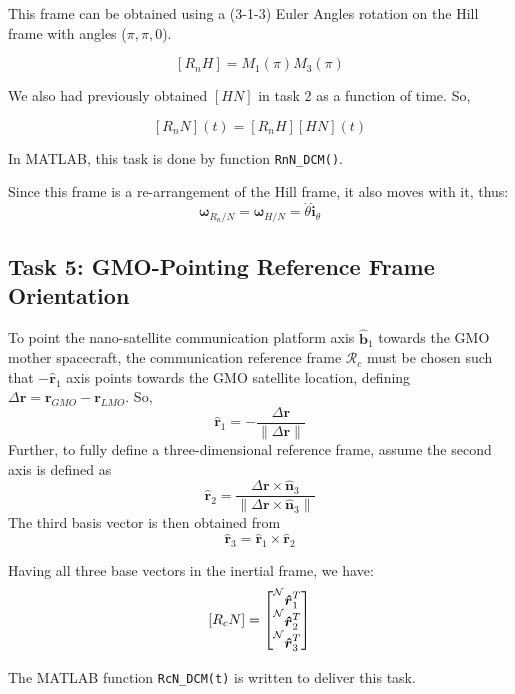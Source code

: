 \documentclass[12pt,a4paper]{report}
\begin{document}
	This frame can be obtained using a (3-1-3) Euler Angles rotation on the Hill frame with angles ($\pi, \pi, 0$).
	
	$$[R_nH] = M_1(\pi)M_3(\pi)$$
	
	
	 We also had previously obtained $[HN]$ in task 2 as a function of time. So,
	 
	 $$[R_nN] (t) = [R_nH][HN](t) $$
	 
	 In MATLAB, this task is done by function \texttt{RnN\_DCM()}.
	
	Since this frame is a re-arrangement of the Hill frame, it also moves with it, thus:
	$$\boldsymbol{\omega}_{R_n/N} = \boldsymbol{\omega}_{H/N} = \dot{\theta}\boldsymbol{\hat{i}}_\theta$$
	 
	
	
	
	\subsection{Task 5: GMO-Pointing Reference Frame Orientation}
	
	To point the nano-satellite communication platform axis $\boldsymbol{\hat{b}}_1$ towards the GMO mother spacecraft, the communication reference frame $\mathcal{R}_c$ must be chosen such that $-\boldsymbol{\hat{r}}_1$ axis points towards the GMO satellite location, defining $\Delta\boldsymbol{r} = \boldsymbol{r}_{GMO} - \boldsymbol{r}_{LMO}$. So,
	$$\boldsymbol{\hat{r}}_1 = -\frac{\Delta\boldsymbol{r}}{\|\Delta\boldsymbol{r}\|}$$
	Further, to fully define a three-dimensional reference frame, assume the second axis is defined as
	$$\boldsymbol{\hat{r}}_2 = \frac{\Delta\boldsymbol{r}\times\boldsymbol{\hat{n}}_3}{\|\Delta\boldsymbol{r}\times\boldsymbol{\hat{n}}_3\|}$$
	The third basis vector is then obtained from
	$$\boldsymbol{\hat{r}}_3 = \boldsymbol{\hat{r}}_1 \times \boldsymbol{\hat{r}}_2$$
	
	Having all three base vectors in the inertial frame, we have:
	$$[R_cN] = 
	\begin{bmatrix}
		\prescript{\mathcal{N}}{}{\boldsymbol{\hat{r}}_1 ^ T} \\
		\prescript{\mathcal{N}}{}{\boldsymbol{\hat{r}}_2 ^ T} \\
		\prescript{\mathcal{N}}{}{\boldsymbol{\hat{r}}_3 ^ T} \\
	\end{bmatrix}$$
	
	The MATLAB function \texttt{RcN\_DCM(t)} is written to deliver this task.
	
\end{document}
